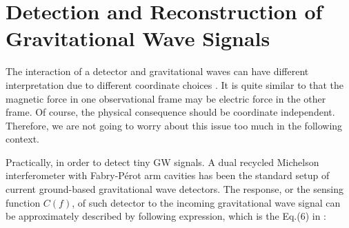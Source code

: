

\section{Detection and Reconstruction of Gravitational Wave Signals}
The interaction of a detector and gravitational waves can have different interpretation due to different coordinate choices \cite{ifo:gauge}. It is quite similar to that the magnetic force in one observational frame may be electric force in the other frame. Of course, the physical consequence should be coordinate independent. Therefore, we are not going to worry about this issue too much in the following context.

Practically, in order to detect tiny GW signals. A dual recycled Michelson interferometer with Fabry-P\'erot arm cavities has been the standard setup of current ground-based gravitational wave detectors. The response, or the sensing function $C(f)$, of such detector to the incoming gravitational wave signal can be approximately described by following expression, which is the Eq.(6) in \cite{mif:response}:

